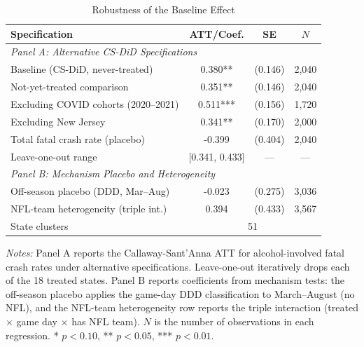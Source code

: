 \begin{table}[t]
\centering
\caption{Robustness of the Baseline Effect}
\label{tab:robustness}
\begin{tabular}{lccc}
\toprule
Specification & ATT/Coef. & SE & $N$ \\
\midrule
\multicolumn{4}{l}{\textit{Panel A: Alternative CS-DiD Specifications}} \\
Baseline (CS-DiD, never-treated) & 0.380** & (0.146) & 2,040 \\
Not-yet-treated comparison & 0.351** & (0.146) & 2,040 \\
Excluding COVID cohorts (2020--2021) & 0.511*** & (0.156) & 1,720 \\
Excluding New Jersey & 0.341** & (0.170) & 2,000 \\
Total fatal crash rate (placebo) & -0.399 & (0.404) & 2,040 \\
Leave-one-out range & [0.341, 0.433] & --- & --- \\
\midrule
\multicolumn{4}{l}{\textit{Panel B: Mechanism Placebo and Heterogeneity}} \\
Off-season placebo (DDD, Mar--Aug) & -0.023 & (0.275) & 3,036 \\
NFL-team heterogeneity (triple int.) & 0.394 & (0.433) & 3,567 \\
\midrule
State clusters & \multicolumn{3}{c}{51} \\
\bottomrule
\end{tabular}
\begin{tablenotes}
\small
\item \textit{Notes:} Panel A reports the Callaway-Sant'Anna ATT for alcohol-involved fatal crash rates under alternative specifications. Leave-one-out iteratively drops each of the 18 treated states. Panel B reports coefficients from mechanism tests: the off-season placebo applies the game-day DDD classification to March--August (no NFL), and the NFL-team heterogeneity row reports the triple interaction (treated $\times$ game day $\times$ has NFL team). $N$ is the number of observations in each regression. * $p<0.10$, ** $p<0.05$, *** $p<0.01$.
\end{tablenotes}
\end{table}

